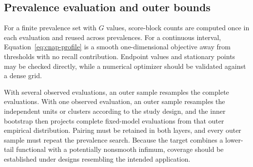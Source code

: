 \documentclass[11pt]{article}
\theoremstyle{remark}
\begin{document}
\subsection{Prevalence evaluation and outer bounds}

For a finite prevalence set with $G$ values, score-block counts are computed once in each evaluation and reused across prevalences. For a continuous interval, Equation~\eqref{eq:cnap-profile} is a smooth one-dimensional objective away from thresholds with no recall contribution. Endpoint values and stationary points may be checked directly, while a numerical optimizer should be validated against a dense grid.

With several observed evaluations, an outer sample resamples the complete evaluations. With one observed evaluation, an outer sample resamples the independent units or clusters according to the study design, and the inner bootstrap then projects complete fixed-model evaluations from that outer empirical distribution. Pairing must be retained in both layers, and every outer sample must repeat the prevalence search. Because the target combines a lower-tail functional with a potentially nonsmooth infimum, coverage should be established under designs resembling the intended application.
\end{document}
